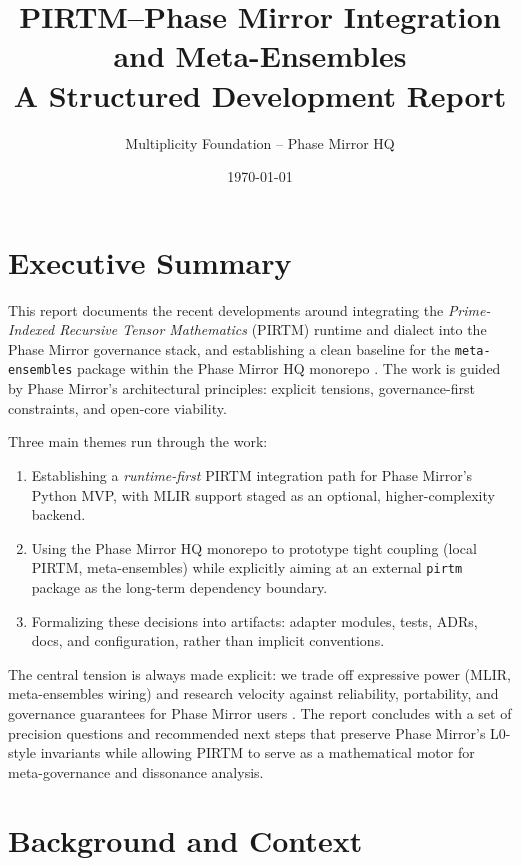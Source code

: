 \documentclass[11pt]{article}
\title{PIRTM--Phase Mirror Integration and Meta-Ensembles\\
\large A Structured Development Report}
\author{Multiplicity Foundation -- Phase Mirror HQ}
\date{\today}
\begin{document}
\maketitle

\tableofcontents

\section{Executive Summary}

This report documents the recent developments around integrating the \emph{Prime-Indexed Recursive Tensor Mathematics} (PIRTM) runtime and dialect into the Phase Mirror governance stack, and establishing a clean baseline for the \texttt{meta-ensembles} package within the Phase Mirror HQ monorepo \cite{pirtm-pyproject,pm-phases0-3,pm-gcp-guide,pm-mvp-analysis,hq-pirtm-local}. The work is guided by Phase Mirror's architectural principles: explicit tensions, governance-first constraints, and open-core viability.

Three main themes run through the work:
\begin{enumerate}[label=(\alph*)]
  \item Establishing a \emph{runtime-first} PIRTM integration path for Phase Mirror's Python MVP, with MLIR support staged as an optional, higher-complexity backend.
  \item Using the Phase Mirror HQ monorepo to prototype tight coupling (local PIRTM, meta-ensembles) while explicitly aiming at an external \texttt{pirtm} package as the long-term dependency boundary.
  \item Formalizing these decisions into artifacts: adapter modules, tests, ADRs, docs, and configuration, rather than implicit conventions.
\end{enumerate}

The central tension is always made explicit: we trade off expressive power (MLIR, meta-ensembles wiring) and research velocity against reliability, portability, and governance guarantees for Phase Mirror users \cite{pm-phases0-3,pm-mvp-analysis}. The report concludes with a set of precision questions and recommended next steps that preserve Phase Mirror's L0-style invariants while allowing PIRTM to serve as a mathematical motor for meta-governance and dissonance analysis.

\section{Background and Context}
\end{document}
